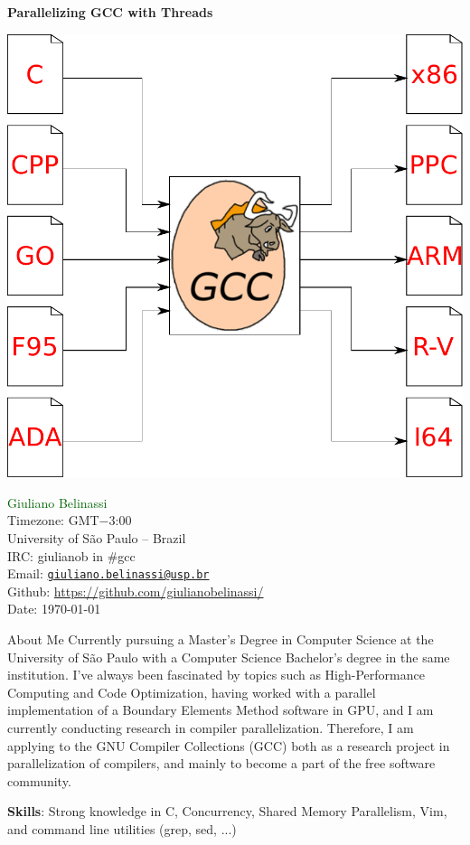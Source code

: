 \documentclass[12pt]{article}
\begin{document}
\newtheorem{theorem}{Teorema}%
\newtheorem{corollary}{Corolário}[theorem]
\newtheorem{lemma}[theorem]{Lema}

\begin{center}
\Huge \bf
Parallelizing GCC with Threads
\vspace{0.5cm}
\end{center}
\vspace*{\fill}
{
     \centering
     \includegraphics[scale=0.7]{logo.pdf}
    \par
}
\vspace*{\fill}
\normalsize{
\noindent\textcolor{darkgreen}{Giuliano Belinassi} \\
Timezone: GMT$-$3:00 \\
University of São Paulo -- Brazil \\
IRC: giulianob in \#gcc \\
Email: \href{mailto:giuliano.belinassi@usp.br}{\texttt{giuliano.belinassi@usp.br}} \\
Github: \url{https://github.com/giulianobelinassi/} \\
Date: \today
}
\newpage

\begin{section}{About Me}
    Currently pursuing a Master's Degree in Computer Science at the University
    of São Paulo with a Computer Science Bachelor's degree in the same
    institution. I've always been fascinated by topics such as
    High-Performance Computing and Code Optimization, having worked with
    a parallel implementation of a Boundary Elements Method software in GPU,
    and I am currently
    conducting research in compiler parallelization. Therefore, I am applying
    to the GNU Compiler Collections
    (GCC) both as a research project in parallelization of compilers, and
    mainly to become a part of the free software community.

    \textbf{Skills}: Strong knowledge in C, Concurrency, Shared Memory Parallelism, Vim, and command line utilities (grep, sed, ...)
\end{section}
\end{document}
